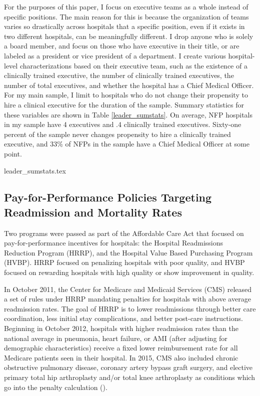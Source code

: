 \documentclass[12pt]{article}
\begin{document}
    For the purposes of this paper, I focus on executive teams as a whole instead of specific positions. The main reason for this is because the organization of teams varies so drastically across hospitals that a specific position, even if it exists in two different hospitals, can be meaningfully different. I drop anyone who is solely a board member, and focus on those who have executive in their title, or are labeled as a president or vice president of a department. I create various hospital-level characterizations based on their executive team, such as the existence of a clinically trained executive, the number of clinically trained executives, the number of total executives, and whether the hospital has a Chief Medical Officer. For my main sample, I limit to hospitals who do not change their propensity to hire a clinical executive for the duration of the sample. Summary statistics for these variables are shown in Table \ref{leader_sumstats}. On average, NFP hospitals in my sample have 4 executives and .4 clinically trained executives. Sixty-one percent of the sample never changes propensity to hire a clinically trained executive, and 33\% of NFPs in the sample have a Chief Medical Officer at some point. 

     {leader_sumstats.tex}
  
    \subsection{Pay-for-Performance Policies Targeting Readmission and Mortality Rates}\label{sec:hrrp}

    Two programs were passed as part of the Affordable Care Act that focused on pay-for-performance incentives for hospitals: the Hospital Readmissions Reduction Program (HRRP), and the Hospital Value Based Purchasing Program (HVBP). HRRP focused on penalizing hospitals with poor quality, and HVBP focused on rewarding hospitals with high quality or show improvement in quality. 

    In October 2011, the Center for Medicare and Medicaid Services (CMS) released a set of rules under HRRP mandating penalties for hospitals with above average readmission rates. The goal of HRRP is to lower readmissions through better care coordination, less initial stay complications, and better post-care instructions. Beginning in October 2012, hospitals with higher readmission rates than the national average in pneumonia, heart failure, or AMI (after adjusting for demographic characteristics) receive a fixed lower reimbursement rate for all Medicare patients seen in their hospital. In 2015, CMS also included chronic obstructive pulmonary disease, coronary artery bypass graft surgery, and elective primary total hip arthroplasty and/or total knee arthroplasty as conditions which go into the penalty calculation (\cite{CMS}). 
    
\end{document}
